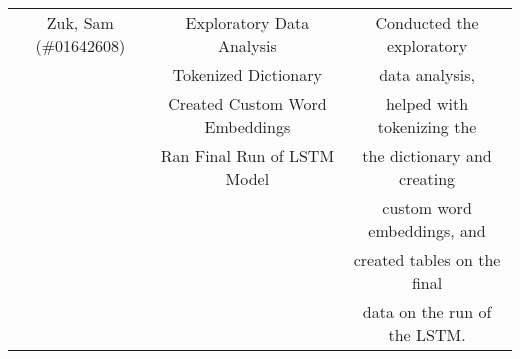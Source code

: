 \documentclass[11pt]{article}
\begin{document}
\begin{table}[H]
\begin{tabular}{c|c|c}
        \hline
        Zuk, Sam (\#01642608)       & Exploratory Data Analysis      & Conducted the exploratory  \\
                                    & Tokenized Dictionary           & data analysis,\\
                                    & Created Custom Word Embeddings &helped with tokenizing the  \\
                                    & Ran Final Run of LSTM Model    &the dictionary and creating \\
                                    &                                &custom word embeddings, and \\
                                    &                                &created tables on the final \\
                                    &                                &data on the run of the LSTM.\\
        \hline
    \end{tabular}
    \label{tab:my_label}
\end{table}




\end{document}
